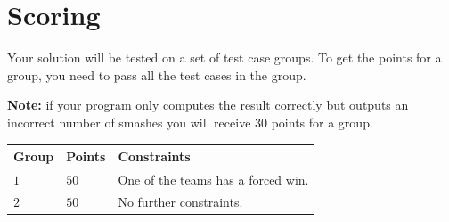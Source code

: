 \section*{Scoring}
Your solution will be tested on a set of test case groups.
To get the points for a group, you need to pass all the test cases in the group.

\textbf{Note:} if your program only computes the result correctly but outputs an incorrect number of smashes you will receive $30$ points for a group.

\noindent
\begin{tabular}{| l | l | p{10cm} |}
\hline
Group & Points & Constraints \\ \hline
  $1$    & $50$        & One of the teams has a forced win.\\ \hline 
  $2$    & $50$        & No further constraints. \\ \hline 
\end{tabular}

